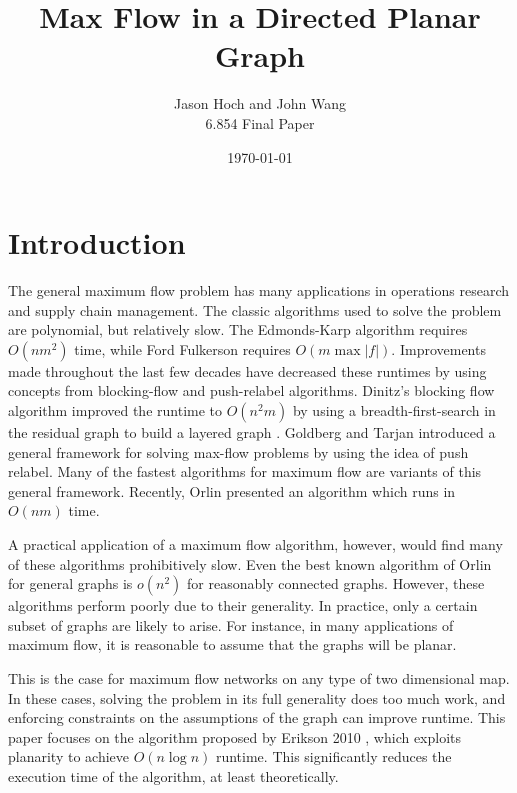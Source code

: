 \documentclass[12pt]{article}
\title{Max Flow in a Directed Planar Graph}
\date{\today}
\author{Jason Hoch and John Wang \\
6.854 Final Paper}
\begin{document}
\maketitle


\tableofcontents

\newpage

\section{Introduction}

The general maximum flow problem has many applications in operations research and supply chain management. The classic algorithms used to solve the problem are polynomial, but relatively slow. The Edmonds-Karp algorithm requires $O(n m^2)$ time, while Ford Fulkerson requires $O(m \max |f|)$. Improvements made throughout the last few decades have decreased these runtimes by using concepts from blocking-flow and push-relabel algorithms. Dinitz's blocking flow algorithm improved the runtime to $O(n^2 m)$ by using a breadth-first-search in the residual graph to build a layered graph \cite{dinitz1970}. Goldberg and Tarjan \cite{goldbergtarjan1986} introduced a general framework for solving max-flow problems by using the idea of push relabel. Many of the fastest algorithms for maximum flow are variants of this general framework. Recently, Orlin presented an algorithm which runs in $O(nm)$ time. 

A practical application of a maximum flow algorithm, however, would find many of these algorithms prohibitively slow. Even the best known algorithm of Orlin for general graphs is $o(n^2)$ for reasonably connected graphs. However, these algorithms perform poorly due to their generality. In practice, only a certain subset of graphs are likely to arise. For instance, in many applications of maximum flow, it is reasonable to assume that the graphs will be planar. 

This is the case for maximum flow networks on any type of two dimensional map. In these cases, solving the problem in its full generality does too much work, and enforcing constraints on the assumptions of the graph can improve runtime. This paper focuses on the algorithm proposed by Erikson 2010 \cite{erikson2010}, which exploits planarity to achieve $O(n \log n)$ runtime. This significantly reduces the execution time of the algorithm, at least theoretically.
\end{document}
